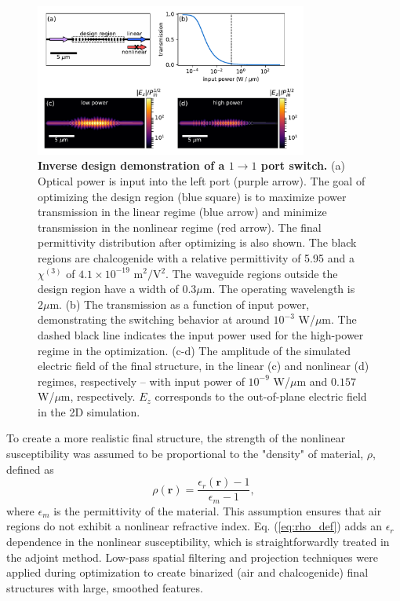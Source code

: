 \begin{figure}[t]
\centering
\includegraphics[width=0.8\textwidth]{figures/angler_2_port_11_1.pdf}
\caption{\label{fig:2_port} \textbf{Inverse design demonstration of a $1 \to 1$ port switch.}  (a) Optical power is input into the left port (purple arrow). The goal of optimizing the design region (blue square) is to maximize power transmission in the linear regime (blue arrow) and minimize transmission in the nonlinear regime (red arrow).  The final permittivity distribution after optimizing is also shown. The black regions are chalcogenide with a relative permittivity of 5.95 and a $\chi^{(3)}$ of $4.1\times 10^{-19}$ m$^2/$V$^{2}$. The waveguide regions outside the design region have a width of $0.3 \mu$m. The operating wavelength is $2\mu$m. (b) The transmission as a function of input power, demonstrating the switching behavior at around $10^{-3}$ W/$\mu$m.  The dashed black line indicates the input power used for the high-power regime in the optimization. (c-d) The amplitude of the simulated electric field of the final structure, in the linear (c) and nonlinear (d) regimes, respectively -- with input power of $10^{-9}$ W/$\mu$m and $0.157$ W/$\mu$m, respectively. $E_z$ corresponds to the out-of-plane electric field in the 2D simulation.}
\end{figure}
%

To create a more realistic final structure, the strength of the nonlinear susceptibility was assumed to be proportional to the "density" of material, $\rho$, defined as 
\begin{equation}
\rho(\mathbf{r})= \frac{\epsilon_r(\mathbf{r}) - 1}{\epsilon_m - 1 },
\label{eq:rho_def}
\end{equation}
where $\epsilon_m$ is the permittivity of the material. This assumption ensures that air regions do not exhibit a nonlinear refractive index. Eq. (\ref{eq:rho_def}) adds an $\epsilon_r$ dependence in the nonlinear susceptibility, which is straightforwardly treated in the adjoint method.  Low-pass spatial filtering and projection techniques \cite{zhou2015minimum} were applied during optimization to create binarized (air and chalcogenide) final structures with large, smoothed features.

